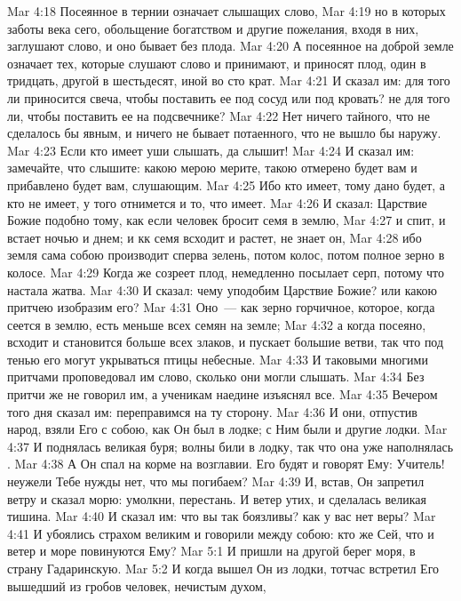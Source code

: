 \vs Mar 4:18 Посеянное в тернии означает слышащих слово,
\vs Mar 4:19 но в которых заботы века сего, обольщение богатством и другие пожелания, входя в них, заглушают слово, и оно бывает без плода.
\vs Mar 4:20 А посеянное на доброй земле означает тех, которые слушают слово и принимают, и приносят плод, один в тридцать, другой в шестьдесят, иной во сто крат.
\rsbpar\vs Mar 4:21 И сказал им: для того ли приносится свеча, чтобы поставить ее под сосуд или под кровать? не для того ли, чтобы поставить ее на подсвечнике?
\vs Mar 4:22 Нет ничего тайного, что не сделалось бы явным, и ничего не бывает потаенного, что не вышло бы наружу.
\vs Mar 4:23 Если кто имеет уши слышать, да слышит!
\vs Mar 4:24 И сказал им: замечайте, что слышите: какою мерою мерите, такою отмерено будет вам и прибавлено будет вам, слушающим.
\vs Mar 4:25 Ибо кто имеет, тому дано будет, а кто не имеет, у того отнимется и то, что имеет.
\rsbpar\vs Mar 4:26 И сказал: Царствие Божие подобно тому, как если человек бросит семя в землю,
\vs Mar 4:27 и спит, и встает ночью и днем; и кк семя всходит и растет, не знает он,
\vs Mar 4:28 ибо земля сама собою производит сперва зелень, потом колос, потом полное зерно в колосе.
\vs Mar 4:29 Когда же созреет плод, немедленно посылает серп, потому что настала жатва.
\rsbpar\vs Mar 4:30 И сказал: чему уподобим Царствие Божие? или какою притчею изобразим его?
\vs Mar 4:31 Оно~--- как зерно горчичное, которое, когда сеется в землю, есть меньше всех семян на земле;
\vs Mar 4:32 а когда посеяно, всходит и становится больше всех злаков, и пускает большие ветви, так что под тенью его могут укрываться птицы небесные.
\vs Mar 4:33 И таковыми многими притчами проповедовал им слово, сколько они могли слышать.
\vs Mar 4:34 Без притчи же не говорил им, а ученикам наедине изъяснял все.
\rsbpar\vs Mar 4:35 Вечером того дня сказал им: переправимся на ту сторону.
\vs Mar 4:36 И они, отпустив народ, взяли Его с собою, как Он был в лодке; с Ним были и другие лодки.
\vs Mar 4:37 И поднялась великая буря; волны били в лодку, так что она уже наполнялась .
\vs Mar 4:38 А Он спал на корме на возглавии. Его будят и говорят Ему: Учитель! неужели Тебе нужды нет, что мы погибаем?
\vs Mar 4:39 И, встав, Он запретил ветру и сказал морю: умолкни, перестань. И ветер утих, и сделалась великая тишина.
\vs Mar 4:40 И сказал им: что вы так боязливы? как у вас нет веры?
\vs Mar 4:41 И убоялись страхом великим и говорили между собою: кто же Сей, что и ветер и море повинуются Ему?
\vs Mar 5:1 И пришли на другой берег моря, в страну Гадаринскую.
\vs Mar 5:2 И когда вышел Он из лодки, тотчас встретил Его вышедший из гробов человек,  нечистым духом,
